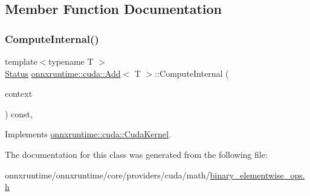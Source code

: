 \subsection{Member Function Documentation}
\mbox{\label{classonnxruntime_1_1cuda_1_1Add_a34f68019a69cf99cbc2bf9adf96cbbe6}} 
\subsubsection{\texorpdfstring{Compute\+Internal()}{ComputeInternal()}}
{\footnotesize\ttfamily template$<$typename T $>$ \\
\mbox{\hyperlink{classonnxruntime_1_1common_1_1Status}{Status}} \mbox{\hyperlink{classonnxruntime_1_1cuda_1_1Add}{onnxruntime\+::cuda\+::\+Add}}$<$ T $>$\+::Compute\+Internal (\begin{DoxyParamCaption}\item[{\mbox{\hyperlink{classonnxruntime_1_1OpKernelContext}{Op\+Kernel\+Context}} $\ast$}]{context }\end{DoxyParamCaption}) const\hspace{0.3cm}{\ttfamily [override]}, {\ttfamily [virtual]}}



Implements \mbox{\hyperlink{classonnxruntime_1_1cuda_1_1CudaKernel_aca7af04ae448017d6023d30bba231ebb}{onnxruntime\+::cuda\+::\+Cuda\+Kernel}}.



The documentation for this class was generated from the following file\+:\begin{DoxyCompactItemize}
\item 
onnxruntime/onnxruntime/core/providers/cuda/math/\mbox{\hyperlink{binary__elementwise__ops_8h}{binary\+\_\+elementwise\+\_\+ops.\+h}}\end{DoxyCompactItemize}
